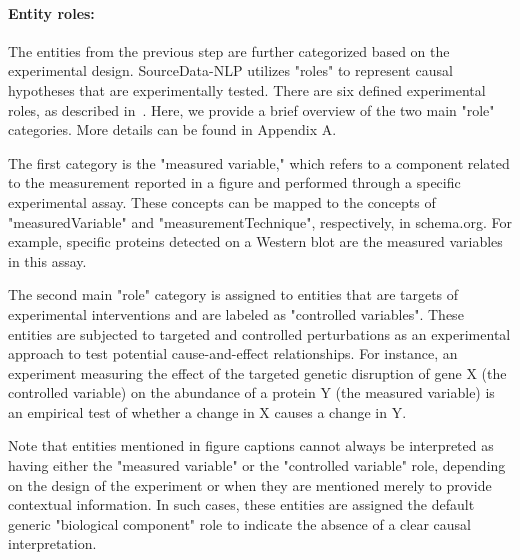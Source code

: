 \documentclass{bioinfo}
\begin{document}
\begin{methods}
\paragraph{Entity roles:} 
The entities from the previous step are further categorized based on the experimental design. SourceData-NLP utilizes "roles" to represent causal hypotheses that are experimentally tested. There are six defined experimental roles, as described in~\citet{sourcedata}. Here, we provide a brief overview of the two main "role" categories. More details can be found in Appendix A.

The first category is the "measured variable," which refers to a component related to the measurement reported in a figure and performed through a specific experimental assay. These concepts can be mapped to the concepts of "measuredVariable" and "measurementTechnique", respectively, in schema.org. For example, specific proteins detected on a Western blot are the measured variables in this assay.

The second main "role" category is assigned to entities that are targets of experimental interventions and are labeled as "controlled variables". These entities are subjected to targeted and controlled perturbations as an experimental approach to test potential cause-and-effect relationships. For instance, an experiment measuring the effect of the targeted genetic disruption of gene X (the controlled variable) on the abundance of a protein Y (the measured variable) is an empirical test of whether a change in X causes a change in Y.

Note that entities mentioned in figure captions cannot always be interpreted as having either the "measured variable" or the "controlled variable" role, depending on the design of the experiment or when they are mentioned merely to provide contextual information. In such cases, these entities are assigned the default generic "biological component" role to indicate the absence of a clear causal interpretation.

\begin{table}[!t]
 {

}
\end{table}
\end{methods}
\end{document}
